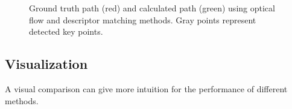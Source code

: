\documentclass{easychair}
\begin{document}
\begin{figure}[h!]
\centering
{}
\caption{Ground truth path (red) and calculated path (green) using optical flow and descriptor matching methods. Gray points represent detected key points.}
\end{figure}

\subsection{Visualization}
A visual comparison can give more intuition for the performance of different methods. 
\end{document}
